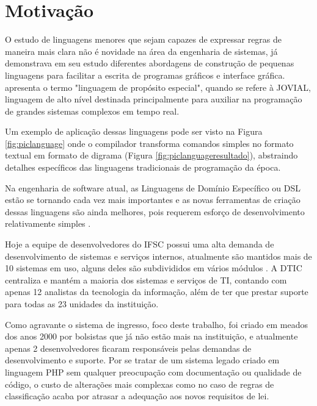 \section{Motivação}
\label{motivacao}

O estudo de linguagens menores que sejam capazes de expressar regras de maneira mais clara não é novidade na área da engenharia de sistemas,  já demonstrava em seu estudo diferentes abordagens de construção de pequenas linguagens para facilitar a escrita de programas gráficos e interface gráfica.  apresenta o termo "linguagem de propósito especial", quando se refere à \gls{JOVIAL}, linguagem de alto nível destinada principalmente para auxiliar na programação de grandes sistemas complexos em tempo real. 

Um exemplo de aplicação dessas linguagens pode ser visto na Figura \ref{fig:piclanguage} onde o compilador transforma comandos simples no formato textual em formato de digrama (Figura \ref{fig:piclanguageresultado}), abstraindo detalhes específicos das linguagens tradicionais de programação da época.





Na engenharia de software atual, as Linguagens de Domínio Específico ou DSL estão se tornando cada vez mais importantes e as novas ferramentas de criação dessas linguagens são ainda melhores, pois requerem esforço de desenvolvimento relativamente simples \cite{dslengineering}.


Hoje a equipe de desenvolvedores do \gls{IFSC} possui uma alta demanda de desenvolvimento de sistemas e serviços internos, atualmente são mantidos mais de 10 sistemas em uso, alguns deles são subdivididos em vários módulos \cite{catalogoifsc}. A \gls{DTIC} centraliza e mantém a maioria dos sistemas e serviços de TI, contando com apenas 12 analistas da tecnologia da informação, além de ter que prestar suporte para todas as 23 unidades da instituição. 

Como agravante o sistema de ingresso, foco deste trabalho, foi criado em meados dos anos 2000 por bolsistas que já não estão mais na instituição, e atualmente apenas 2 desenvolvedores ficaram responsáveis pelas demandas de desenvolvimento e suporte. Por se tratar de um sistema legado criado em linguagem PHP sem qualquer preocupação com documentação ou qualidade de código, o custo de alterações mais complexas como no caso de regras de classificação acaba por atrasar a adequação aos novos requisitos de lei. 

